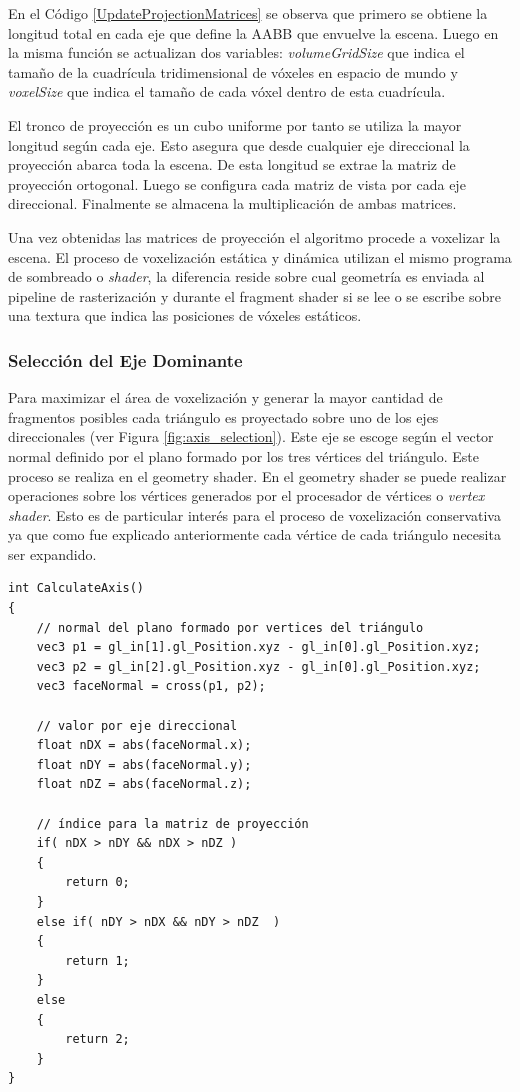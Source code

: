 En el Código \ref{UpdateProjectionMatrices} se observa que primero se obtiene la longitud total en cada eje que define la \ac{AABB} que envuelve la escena. Luego en la misma función se actualizan dos variables: \emph{volumeGridSize} que indica el tamaño de la cuadrícula tridimensional de vóxeles en espacio de mundo y \emph{voxelSize} que indica el tamaño de cada vóxel dentro de esta cuadrícula. 

El tronco de proyección es un cubo uniforme por tanto se utiliza la mayor longitud según cada eje. Esto asegura que desde cualquier eje direccional la proyección abarca toda la escena. De esta longitud se extrae la matriz de proyección ortogonal. Luego se configura cada matriz de vista por cada eje direccional. Finalmente se almacena la multiplicación de ambas matrices.

Una vez obtenidas las matrices de proyección el algoritmo procede a voxelizar la escena. El proceso de voxelización estática y dinámica utilizan el mismo programa de sombreado o \emph{shader}, la diferencia reside sobre cual geometría es enviada al pipeline de rasterización y durante el fragment shader si se lee o se escribe sobre una textura que indica las posiciones de vóxeles estáticos.

\subsubsection{Selección del Eje Dominante}
Para maximizar el área de voxelización y generar la mayor cantidad de fragmentos posibles cada triángulo es proyectado sobre uno de los ejes direccionales (ver Figura \ref{fig:axis_selection}). Este eje se escoge según el vector normal definido por el plano formado por los tres vértices del triángulo. Este proceso se realiza en el geometry shader. En el geometry shader se puede realizar operaciones sobre los vértices generados por el procesador de vértices o \emph{vertex shader}. Esto es de particular interés para el proceso de voxelización conservativa ya que como fue explicado anteriormente cada vértice de cada triángulo necesita ser expandido.
\\
\begin{lstlisting}[caption={Selección del eje dominante para la proyección ortogonal.}, label=CalculateAxis]
int CalculateAxis()
{
    // normal del plano formado por vertices del triángulo
    vec3 p1 = gl_in[1].gl_Position.xyz - gl_in[0].gl_Position.xyz;
    vec3 p2 = gl_in[2].gl_Position.xyz - gl_in[0].gl_Position.xyz;
    vec3 faceNormal = cross(p1, p2);

    // valor por eje direccional
    float nDX = abs(faceNormal.x);
    float nDY = abs(faceNormal.y);
    float nDZ = abs(faceNormal.z);

    // índice para la matriz de proyección
    if( nDX > nDY && nDX > nDZ )
    {
        return 0;
    }
    else if( nDY > nDX && nDY > nDZ  )
    {
        return 1;
    }
    else
    {
        return 2;
    }
}
\end{lstlisting}

